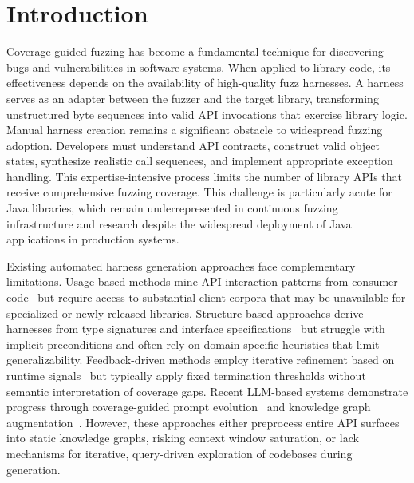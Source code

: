 \section{Introduction}

Coverage-guided fuzzing has become a fundamental technique for discovering bugs and vulnerabilities in software systems. When applied to library code, its effectiveness depends on the availability of high-quality fuzz harnesses. A harness serves as an adapter between the fuzzer and the target library, transforming unstructured byte sequences into valid API invocations that exercise library logic. Manual harness creation remains a significant obstacle to widespread fuzzing adoption. Developers must understand API contracts, construct valid object states, synthesize realistic call sequences, and implement appropriate exception handling. This expertise-intensive process limits the number of library APIs that receive comprehensive fuzzing coverage. This challenge is particularly acute for Java libraries, which remain underrepresented in continuous fuzzing infrastructure and research despite the widespread deployment of Java applications in production systems. 

Existing automated harness generation approaches face complementary limitations. Usage-based methods mine API interaction patterns from consumer code~\cite{DBLP:conf/sigsoft/BabicBCIKKLSW19:FUDGE,DBLP:conf/sp/JeongJYMKJKSH23:UTopia} but require access to substantial client corpora that may be unavailable for specialized or newly released libraries. Structure-based approaches derive harnesses from type signatures and interface specifications~\cite{DBLP:conf/icse:GreenA22:GraphFuzz,DBLP:conf/icse:ShermanN25:OGHarn} but struggle with implicit preconditions and often rely on domain-specific heuristics that limit generalizability. Feedback-driven methods employ iterative refinement based on runtime signals~\cite{DBLP:conf/uss:ZhangLZZZZXLL0H23:Rubick} but typically apply fixed termination thresholds without semantic interpretation of coverage gaps. Recent LLM-based systems demonstrate progress through coverage-guided prompt evolution~\cite{DBLP:conf/ccs:LyuXCC24:PromptFuzz} and knowledge graph augmentation~\cite{DBLP:conf/icse:XuMZZCHLW25:CKGFuzzer}. However, these approaches either preprocess entire API surfaces into static knowledge graphs, risking context window saturation, or lack mechanisms for iterative, query-driven exploration of codebases during generation. 

